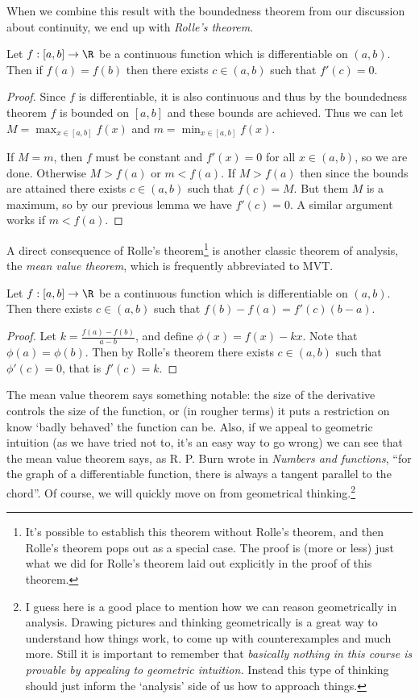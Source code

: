 When we combine this result with the boundedness theorem from our discussion about continuity, we end up with \emph{Rolle's theorem}.

\begin{theorem}
	Let $f: [a, b] \rightarrow \R$ be a continuous function which is differentiable on $(a, b)$. Then if $f(a) = f(b)$ then there exists $c \in (a, b)$ such that $f'(c) = 0$.
\end{theorem}
\begin{proof}
	Since $f$ is differentiable, it is also continuous and thus by the boundedness theorem $f$ is bounded on $[a, b]$ and these bounds are achieved.
	Thus we can let $M = \max_{x \in [a, b]} f(x)$ and $m = \min_{x \in [a, b]} f(x)$.

	If $M = m$, then $f$ must be constant and $f'(x) = 0$ for all $x \in (a, b)$, so we are done.
	Otherwise $M > f(a)$ or $m < f(a)$. If $M > f(a)$ then since the bounds are attained there exists $c \in (a, b)$ such that $f(c) = M$. But them $M$ is a maximum, so by our previous lemma we have $f'(c) = 0$. A similar argument works if $m < f(a)$.
\end{proof}

A direct consequence of Rolle's theorem\footnote{It's possible to establish this theorem without Rolle's theorem, and then Rolle's theorem pops out as a special case. The proof is (more or less) just what we did for Rolle's theorem laid out explicitly in the proof of this theorem.} 
is another classic theorem of analysis, the \emph{mean value theorem}, which is frequently abbreviated to MVT.

\begin{theorem}
	Let $f: [a, b] \rightarrow \R$ be a continuous function which is differentiable on $(a, b)$. Then there exists $c \in (a, b)$ such that $f(b) - f(a) = f'(c)(b - a)$.
\end{theorem}
\begin{proof}
	Let $k = \frac{f(a) - f(b)}{a - b}$, and define $\phi(x) = f(x) - kx$. Note that $\phi(a) = \phi(b)$. Then by Rolle's theorem there exists $c \in (a, b)$ such that $\phi'(c) = 0$, that is $f'(c) = k$.
\end{proof}

The mean value theorem says something notable: the size of the derivative controls the size of the function, or (in rougher terms) it puts a restriction on know `badly behaved' the function can be.
Also, if we appeal to geometric intuition (as we have tried not to, it's an easy way to go wrong) we can see that the mean value theorem says, as R. P. Burn wrote in \emph{Numbers and functions}, ``for the graph of a differentiable function, there is always a tangent parallel to the chord''. Of course, we will quickly move on from geometrical thinking.\footnote{I guess here is a good place to mention how we can reason geometrically in analysis. Drawing pictures and thinking geometrically is a great way to understand how things work, to come up with counterexamples and much more. Still it is important to remember that \emph{basically nothing in this course is provable by appealing to geometric intuition.} Instead this type of thinking should just inform the `analysis' side of us how to approach things.} 

